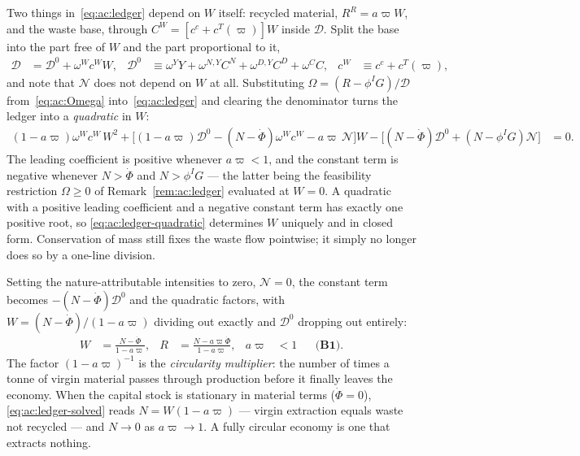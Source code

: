  Two things in~\eqref{eq:ac:ledger} depend on $W$ itself: recycled material, $R^R=a\varpi W$, and the waste base, through $C^W=\left[c^c+c^T(\varpi)\right]W$ inside $\mathcal D$. Split the base into the part free of $W$ and the part proportional to it,
\begin{align}
\mathcal D &= \mathcal D^0+\omega^Wc^WW,
&
\mathcal D^0 &\equiv \omega^YY+\omega^{N,Y}C^N+\omega^{D,Y}C^D+\omega^CC,
&
c^W &\equiv c^c+c^T(\varpi),
\label{eq:ac:base-split}
\end{align}
and note that $\mathcal N$ does not depend on $W$ at all. Substituting $\Omega=\left(R-\phi^IG\right)/\mathcal D$ from~\eqref{eq:ac:Omega} into~\eqref{eq:ac:ledger} and clearing the denominator turns the ledger into a \emph{quadratic} in $W$:
\begin{align}
\left(1-a\varpi\right)\omega^Wc^W\,W^2
+\Big[\left(1-a\varpi\right)\mathcal D^0-\left(N-\dot\Phi\right)\omega^Wc^W-a\varpi\,\mathcal N\Big]W
-\Big[\left(N-\dot\Phi\right)\mathcal D^0+\left(N-\phi^IG\right)\mathcal N\Big] &= 0.
\label{eq:ac:ledger-quadratic}
\end{align}
The leading coefficient is positive whenever $a\varpi<1$, and the constant term is negative whenever $N>\dot\Phi$ and $N>\phi^IG$ --- the latter being the feasibility restriction $\Omega\ge0$ of Remark~\ref{rem:ac:ledger} evaluated at $W=0$. A quadratic with a positive leading coefficient and a negative constant term has exactly one positive root, so \eqref{eq:ac:ledger-quadratic} determines $W$ uniquely and in closed form. Conservation of mass still fixes the waste flow pointwise; it simply no longer does so by a one-line division.

 Setting the nature-attributable intensities to zero, $\mathcal N=0$, the constant term becomes $-\left(N-\dot\Phi\right)\mathcal D^0$ and the quadratic factors, with $W=\left(N-\dot\Phi\right)/\left(1-a\varpi\right)$ dividing out exactly and $\mathcal D^0$ dropping out entirely:
\begin{align}
W &= \frac{N-\dot\Phi}{1-a\varpi},
&
R &= \frac{N-a\varpi\dot\Phi}{1-a\varpi},
&
a\varpi&<1
&&\textbf{(B1)}.
\label{eq:ac:ledger-solved}
\end{align}
The factor $\left(1-a\varpi\right)^{-1}$ is the \emph{circularity multiplier}: the number of times a tonne of virgin material passes through production before it finally leaves the economy. When the capital stock is stationary in material terms ($\dot\Phi=0$), \eqref{eq:ac:ledger-solved} reads $N=W\left(1-a\varpi\right)$ --- virgin extraction equals waste not recycled --- and $N\to0$ as $a\varpi\to1$. A fully circular economy is one that extracts nothing.

